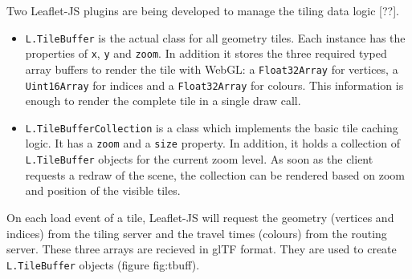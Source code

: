       Two Leaflet-JS plugins are being developed to manage the tiling data logic [??].\par
      \begin{itemize}
        \item \texttt{L.TileBuffer} is the actual class for all geometry tiles. Each instance has the properties of \texttt{x}, \texttt{y} and \texttt{zoom}. In addition it stores the three required typed array buffers to render the tile with WebGL: a \texttt{Float32Array} for vertices, a \texttt{Uint16Array} for indices and a \texttt{Float32Array} for colours. This information is enough to render the complete tile in a single draw call.
        \item \texttt{L.TileBufferCollection} is a class which implements the basic tile caching logic. It has a \texttt{zoom} and a \texttt{size} property. In addition, it holds a collection of \texttt{L.Tile\-Buffer} objects for the current zoom level. As soon as the client requests a redraw of the scene, the collection can be rendered based on zoom and position of the visible tiles.
      \end{itemize}
      On each load event of a tile, Leaflet-JS will request the geometry (vertices and indices) from the tiling server and the travel times (colours) from the routing server. These three arrays are recieved in glTF format. They are used to create \texttt{L.TileBuffer} objects (figure {fig:tbuff}).\par


